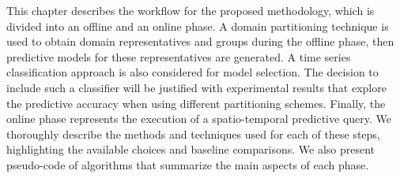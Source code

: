 This chapter describes the workflow for the proposed methodology, which is divided into an offline and an online phase. A domain partitioning technique is used to obtain domain representatives and groups during the offline phase, then predictive models for these representatives are generated. A time series classification approach is also considered for model selection. The decision to include such a classifier will be justified with experimental results that explore the predictive accuracy when using different partitioning schemes. Finally, the online phase represents the execution of a spatio-temporal predictive query. We thoroughly describe the methods and techniques used for each of these steps, highlighting the available choices and baseline comparisons. We also present pseudo-code of algorithms that summarize the main aspects of each phase.